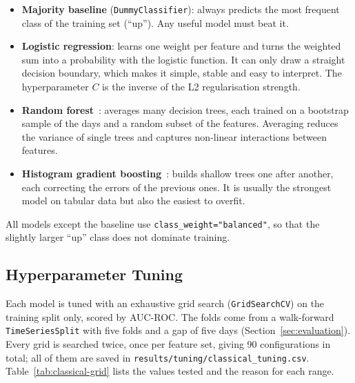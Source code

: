 \begin{itemize}
  \item \textbf{Majority baseline} (\texttt{DummyClassifier}): always predicts
        the most frequent class of the training set (``up''). Any useful model
        must beat it.
  \item \textbf{Logistic regression}: learns one weight per feature and turns
        the weighted sum into a probability with the logistic function. It can
        only draw a straight decision boundary, which makes it simple, stable
        and easy to interpret. The hyperparameter $C$ is the inverse of the L2
        regularisation strength.
  \item \textbf{Random forest}~\cite{a_breiman2001}: averages many decision
        trees, each trained on a bootstrap sample of the days and a random
        subset of the features. Averaging reduces the variance of single trees
        and captures non-linear interactions between features.
  \item \textbf{Histogram gradient boosting}~\cite{a_friedman2001}: builds
        shallow trees one after another, each correcting the errors of the
        previous ones. It is usually the strongest model on tabular data but
        also the easiest to overfit.
\end{itemize}

All models except the baseline use \texttt{class\_weight="balanced"}, so that
the slightly larger ``up'' class does not dominate training.

\subsection{Hyperparameter Tuning}

Each model is tuned with an exhaustive grid search
(\texttt{GridSearchCV}) on the training split only, scored by AUC-ROC. The
folds come from a walk-forward \texttt{TimeSeriesSplit} with five folds and a
gap of five days (Section~\ref{sec:evaluation}). Every grid is searched twice,
once per feature set, giving 90 configurations in total; all of them are saved
in \texttt{results/tuning/classical\_tuning.csv}.
Table~\ref{tab:classical-grid} lists the values tested and the reason for each
range.

